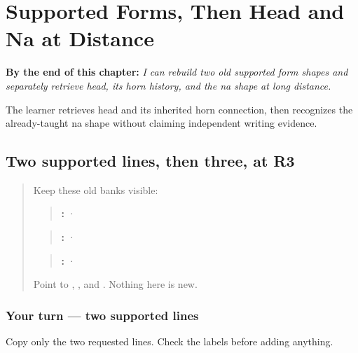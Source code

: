 
\chapter{Supported Forms, Then Head and Na at Distance}
\label{ch:pa-form-head-debt}

\begin{chapteropening}
\textbf{By the end of this chapter:} \emph{I can rebuild two old supported form shapes and separately retrieve head, its horn history, and the na shape at long distance.}

The learner retrieves head and its inherited horn connection, then recognizes the already-taught na shape without claiming independent writing evidence.
\end{chapteropening}

\section[\texorpdfstring{\pa{ਭਾਸ਼ਾ} · \pa{ਰਿਹਾਇਸ਼} · \pa{ਕੰਮ} (supported …)}{ਭਾਸ਼ਾ · ਰਿਹਾਇਸ਼ · ਕੰਮ (supported …)}]{Two supported lines, then three, at R3}

\label{lesson:PA-R28-form-supported-r3}



\begin{quote}
Keep these old banks visible:

\begin{quote}
\textbf{:}  · 
\end{quote}

\begin{quote}
\textbf{:}  · 
\end{quote}

\begin{quote}
\textbf{:}  · 
\end{quote}

Point to \textbf{}, \textbf{}, and \textbf{}. Nothing here is new.
\end{quote}

\subsection*{Your turn — two supported lines}
Copy only the two requested lines. Check the labels before adding anything.

